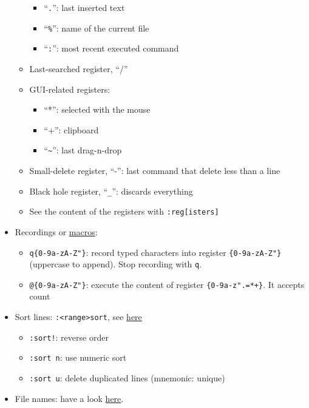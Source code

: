 \documentclass[a4paper,12pt,%
              final%
              ]{article}
\begin{document}
\begin{itemize}
\begin{itemize}
        \begin{itemize}
          \item ``\texttt{.}'': last inserted text
          \item ``\verb!%!'': name of the current file
          \item ``\texttt{:}'': most recent executed command
        \end{itemize}
      \item Last-searched register, ``/''
      \item GUI-related registers:
        \begin{itemize}
          \item ``*'': selected with the mouse
          \item ``+'': clipboard
          \item ``\verb|~|'': last drag-n-drop
        \end{itemize}
      \item Small-delete register, ``-'': last command that delete less than a line
      \item Black hole register, ``\verb|_|'': discards everything
      \item See the content of the registers with \verb|:reg[isters]|
    \end{itemize}
  \item Recordings or
    \href{https://vim.fandom.com/wiki/Macros#Viewing_a_macro}{macros}:
    \begin{itemize}
      \item \verb|q{0-9a-zA-Z"}|: record typed characters into register
        \verb|{0-9a-zA-Z"}| (uppercase to append). Stop recording with \verb|q|.
      \item \verb|@{0-9a-zA-Z"}|: execute the content of register
        \verb|{0-9a-z".=*+}|. It accepts count
    \end{itemize}
  \item Sort lines: \verb|:<range>sort|, see \href{https://vim.fandom.com/wiki/Sort_lines}{here}
    \begin{itemize}
      \item \verb|:sort!|: reverse order
      \item \verb|:sort n|: use numeric sort
      \item \verb|:sort u|: delete duplicated lines (mnemonic: unique)
    \end{itemize}
  \item File names: have a look \href{https://vim.fandom.com/wiki/Get_the_name_of_the_current_file}{here}.

\end{itemize}
\end{document}
